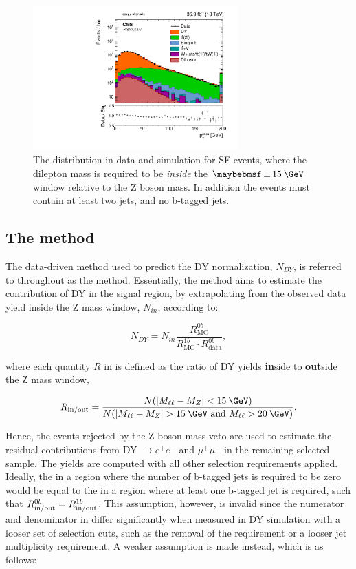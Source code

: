 \begin{figure}
  \centering
  \includegraphics[width=0.7\textwidth]{figs/DY_metlog_sf}
  \caption{The \MET distribution in data and simulation for SF events, where the dilepton mass is required to be \textit{inside} the $\pm15\:\GeV$ window relative to the Z boson mass. In addition the events must contain at least two jets, and no b-tagged jets.}
  \label{fig:DYMET}
\end{figure}

\subsection{The \Rinout method}

The data-driven method used to predict the DY normalization, $N_{DY}$, is referred to throughout as the \Rinout method. Essentially, the method aims to estimate the contribution of DY in the signal region, by extrapolating from the observed data yield inside the Z mass window, $N_{in}$, according to:

\begin{equation}
  N_{DY} = N_{in}\frac{R^{0b}_{\mathrm{MC}}}{R^{1b}_{\mathrm{MC}}\cdot R^{0b}_{\mathrm{data}}},
  \label{eq:NDY}
\end{equation}

where each quantity $R$ in  is defined as the ratio of DY yields \textbf{in}side to \textbf{out}side the Z mass window, 

\begin{equation}
  \Rinout = \frac{N(|M_{\ell\ell} - M_Z|<15\:\GeV)}{N(|M_{\ell\ell} - M_Z|>15\:\GeV\mbox{ and }M_{\ell\ell}>20\:\GeV)}.
  \label{eq:Rinout}
\end{equation}

Hence, the events rejected by the Z boson mass veto are used to estimate the residual contributions from DY $\rightarrow e^+e^-$ and $\mu^+\mu^-$ in the remaining selected sample. The yields are computed with all other selection requirements applied. Ideally, the \Rinout in a region where the number of b-tagged jets is required to be zero would be equal to the \Rinout in a region where at least one b-tagged jet is required, such that $R_\text{in/out}^{0b} = R_\text{in/out}^{1b}$. This assumption, however, is invalid since the numerator and denominator in  differ significantly when measured in DY simulation with a looser set of selection cuts, such as the removal of the \ptmiss requirement or a looser jet multiplicity requirement. A weaker assumption is made instead, which is as follows:

